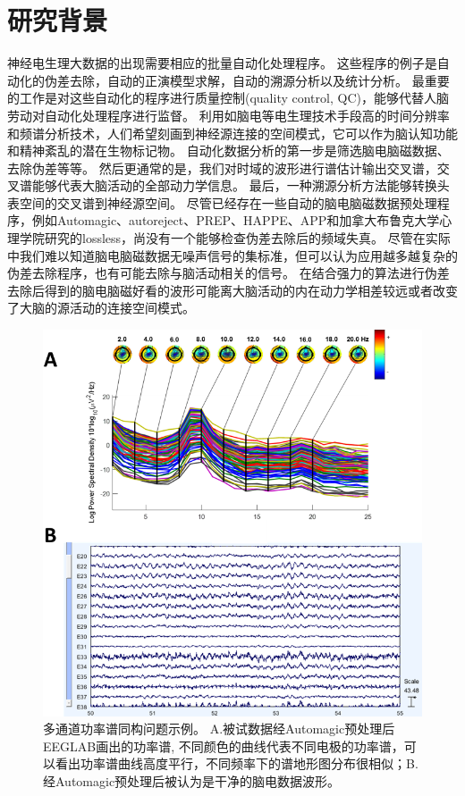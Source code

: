 \section{研究背景}
神经电生理大数据的出现需要相应的批量自动化处理程序。 这些程序的例子是自动化的伪差去除，自动的正演模型求解，自动的溯源分析以及统计分析。 最重要的工作是对这些自动化的程序进行质量控制(quality control, QC)，能够代替人脑劳动对自动化处理程序进行监督。 利用如脑电等电生理技术手段高的时间分辨率和频谱分析技术，人们希望刻画到神经源连接的空间模式，它可以作为脑认知功能和精神紊乱的潜在生物标记物。 自动化数据分析的第一步是筛选脑电脑磁数据、去除伪差等等。 然后更通常的是，我们对时域的波形进行谱估计输出交叉谱，交叉谱能够代表大脑活动的全部动力学信息。 最后，一种溯源分析方法能够转换头表空间的交叉谱到神经源空间。 尽管已经存在一些自动的脑电脑磁数据预处理程序，例如Automagic、autoreject、PREP、HAPPE、APP和加拿大布鲁克大学心理学院研究的lossless，尚没有一个能够检查伪差去除后的频域失真。 尽管在实际中我们难以知道脑电脑磁数据无噪声信号的集标准，但可以认为应用越多越复杂的伪差去除程序，也有可能去除与脑活动相关的信号。 在结合强力的算法进行伪差去除后得到的脑电脑磁好看的波形可能离大脑活动的内在动力学相差较远或者改变了大脑的源活动的连接空间模式。
\begin{figure}
\includegraphics[width=15cm]{pic/palos/issue.png}
\caption{多通道功率谱同构问题示例。 A.被试数据经Automagic预处理后EEGLAB画出的功率谱, 不同颜色的曲线代表不同电极的功率谱，可以看出功率谱曲线高度平行，不同频率下的谱地形图分布很相似；B.经Automagic预处理后被认为是干净的脑电数据波形。}
\label{fig1}
\end{figure}

